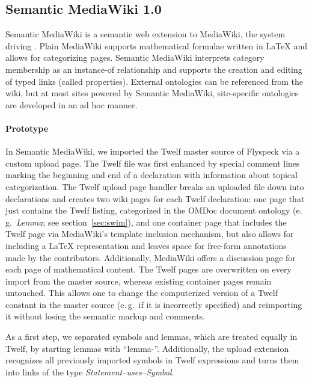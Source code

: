 \subsection{Semantic MediaWiki 1.0}
\label{sec:smw-study}

Semantic MediaWiki\cite{KrSchVr:semwiki-reasoning07} is a semantic web extension
to MediaWiki, the system driving .  Plain MediaWiki supports
mathematical formulae written in {\LaTeX} and allows for categorizing pages.
Semantic MediaWiki interprets category membership as an instance-of relationship
and supports the creation and editing of typed links (called properties).
External ontologies can be referenced from the wiki, but at most sites powered
by Semantic MediaWiki, site-specific ontologies are developed in an ad hoc
manner\cite{ontoworld:sites-using-smw}.

\paragraph{Prototype} In Semantic MediaWiki, we imported the Twelf master source
of Flyspeck via a custom upload page.  The Twelf file was first
enhanced by special comment lines marking the beginning and end of a declaration
with information about topical categorization.    The Twelf upload page
handler breaks an uploaded file down into declarations and creates two wiki
pages for each Twelf declaration: one page that just contains the Twelf listing,
categorized in the OMDoc document ontology (e.\,g.\ \textit{Lemma}; see
section~\ref{sec:swim}), and one container page that includes the Twelf page via
MediaWiki's template inclusion mechanism, but also allows for including a
{\LaTeX} representation and leaves space for free-form annotations made by the
contributors.  Additionally, MediaWiki offers a discussion page for each page of
mathematical content.  The Twelf pages are overwritten on every import from the
master source, whereas existing container pages remain untouched.  This allows
one to change the computerized version of a Twelf constant in the master source
(e.\,g.\ if it is incorrectly specified) and reimporting it without losing the
semantic markup and comments.

As a first step, we separated symbols and lemmas, which are treated equally in Twelf, by starting lemmas with
``lemma-''. Additionally, the
upload extension recognizes all previously imported symbols in Twelf expressions
and turns them into links of the type \textit{Statement--uses--Symbol}.

